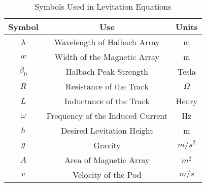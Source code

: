 	\begin{table}[ht]
	\caption{Symbols Used in Levitation Equations}
	\centering
	\begin{tabular}{c c c}
	\hline\hline
	Symbol & Use & Units\\ [0.5ex]
	\hline
	$\lambda$ & Wavelength of Halbach Array & m\\
	$w$ & Width of the Magnetic Array & m\\
	$\beta _{0}$ & Halbach Peak Strength & Tesla\\
	$R$ & Resistance of the Track & $\Omega$\\
	$L$ & Inductance of the Track & Henry\\
	$\omega$ & Frequency of the Induced Current & Hz\\
	$h$ & Desired Levitation Height & m\\
	$g$ & Gravity & $m/s^{2}$\\
	$A$ & Area of Magnetic Array & $m^{2}$\\
	$v$ & Velocity of the Pod & $m/s$\\ [1ex]
	\hline
	\end{tabular}
	\label{table:nonlin}
	\end{table}